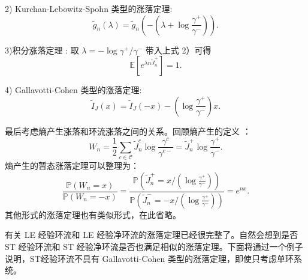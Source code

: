 2) Kurchan-Lebowitz-Spohn 类型的涨落定理:
\begin{equation*}
\tilde{g}_n(\lambda)=\tilde{g}_n\left(-\left(\lambda+\log\frac{\gamma^+}{\gamma^-}\right)\right).
\end{equation*}

3)积分涨落定理 : 取 $\lambda = -\log \gamma^+/\gamma^-$ 带入上式 2）可得
\begin{equation*}
\mathbb{E}\left[e^{\lambda n\tilde{J}^+_n}\right]=1.
\end{equation*}

4) Gallavotti-Cohen 类型的涨落定理:
\begin{equation*}
\tilde{I}_J(x)=\tilde{I}_J(-x)-\left(\log\frac{\gamma^+}{\gamma^-}\right)x.
\end{equation*}

最后考虑熵产生涨落和环流涨落之间的关系。回顾熵产生的定义 \cite{jiang2004mathematical}：
\begin{equation*}
	W_n=\frac{1}{2}\sum_{c\in\mathcal{C}}\tilde{J}^c_n\log\frac{\gamma^c}{\gamma^{c-}}=\tilde{J}^+_n\log\frac{\gamma^+}{\gamma^-}.
\end{equation*}
熵产生的暂态涨落定理可以整理为：
\begin{equation*}
	\frac{\mathbb{P}(W_n=x)}{\mathbb{P}(W_n=-x)}
	= \frac{\mathbb{P}(\tilde{J}^+_n=x/(\log\frac{\gamma^+}{\gamma^-}))}{\mathbb{P}(\tilde{J}^-_n=-x/(\log\frac{\gamma^+}{\gamma^-}))} = e^{nx}.
\end{equation*}
其他形式的涨落定理也有类似形式，在此省略。

有关 LE 经验环流和 LE 经验净环流的涨落定理已经很完整了。自然会想到是否 ST 经验环流和 ST 经验净环流是否也满足相似的涨落定理。下面将通过一个例子说明，ST经验环流不具有 Gallavotti-Cohen 类型的涨落定理，即使只考虑单环系统。

